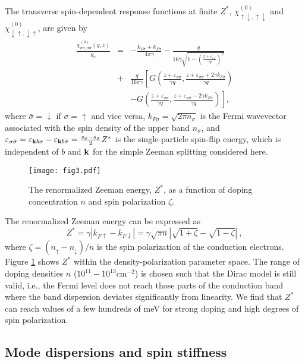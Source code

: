 \documentclass[aps,prb,twocolumn,superscriptaddress]{revtex4-2}
\newcommand{\ud}{{\uparrow\downarrow}}
\newcommand{\du}{{\downarrow\uparrow}}
\newcommand{\si}{\sigma}
\newcommand{\sib}{{\bar{\sigma}}}
\newcommand{\bfk}{{\bf k}}
\newcommand{\s}{\sigma}
\newcommand{\ua}{\uparrow}
\newcommand{\da}{\downarrow}
\newcommand{\ku}{k_{F\ua}}
\newcommand{\kd}{k_{F\da}}
\newcommand{\ks}{k_{F\si}}
\newcommand{\ksb}{k_{F\sib}}
\newcommand{\essb}{\varepsilon_{\si\sib}}
\newcommand{\z}{\zeta}
\begin{document}
The transverse spin-dependent response functions at finite $Z^*$,  $\chi^{(0)}_{\ud,\ud}$ and  $\chi^{(0)}_{\du,\du}$, are given by
\begin{eqnarray}
\frac{\chi^{(0)}_{\s\bar\s,\s\bar\s}(q,z)}{g_v}
&=&
-\frac{\ks+\ksb}{4\pi \gamma}
-\frac{q}{16\gamma\sqrt{1-\left(\frac{z+\essb}{\gamma q}\right)^2}} \nonumber\\
&+&
\frac{q}{16\pi \gamma} \left[G\left( \frac{z+\essb}{\gamma q}, \frac{ z+\essb +2\gamma \ks}{\gamma q}\right)\right. \nonumber\\
&& \left. -G\left( \frac{z+\essb}{\gamma q}, \frac{z+\essb -2\gamma \ksb}{\gamma q}\right)\right],
  \label{eq:NIResponseSpin}
\end{eqnarray}
where $\bar\sigma = \da$ if $\sigma=\ua$ and vice versa, $\ks = \sqrt{2\pi n_\sigma}$ is the Fermi wavevector associated with the spin density of the upper band $n_\sigma$,
and $\essb = \varepsilon_{\bfk b \si} - \varepsilon_{\bfk b \sib} = \frac{s_\si-s_\sib}{2}Z^*$ is the single-particle spin-flip energy, which is independent of $b$ and $\bfk$
for the simple Zeeman splitting considered here.

\begin{figure}
  \texttt{[image: fig3.pdf]}
  \caption{The renormalized Zeeman energy, $Z^*$, as a function of doping concentration $n$ and spin polarization $\zeta$.}
  \label{fig:Zstar}
\end{figure}

The renormalized Zeeman energy can be expressed as
\begin{equation}
  Z^* = \gamma |\ku-\kd| = \gamma \sqrt{\pi n} \left|\sqrt{1+\z}-\sqrt{1-\z} \right| \: ,
  \label{eq:Zstar}
\end{equation}
where $\zeta = (n_\ua - n_\da)/n$ is the spin polarization of the conduction electrons.
Figure \ref{fig:Zstar} shows $Z^*$ within the density-polarization parameter space.
The range of doping densities $n$ ($10^{11}-10^{13}\text{cm}^{-2}$) is chosen such that the Dirac model is still valid, i.e.,
the Fermi level does not reach those parts of the conduction band where the band dispersion deviates significantly from linearity.
We find that $Z^*$ can reach values of a few hundreds of meV for strong doping and high degrees of spin polarization.



\subsection{Mode dispersions and spin stiffness}\label{sec3C}
\end{document}
